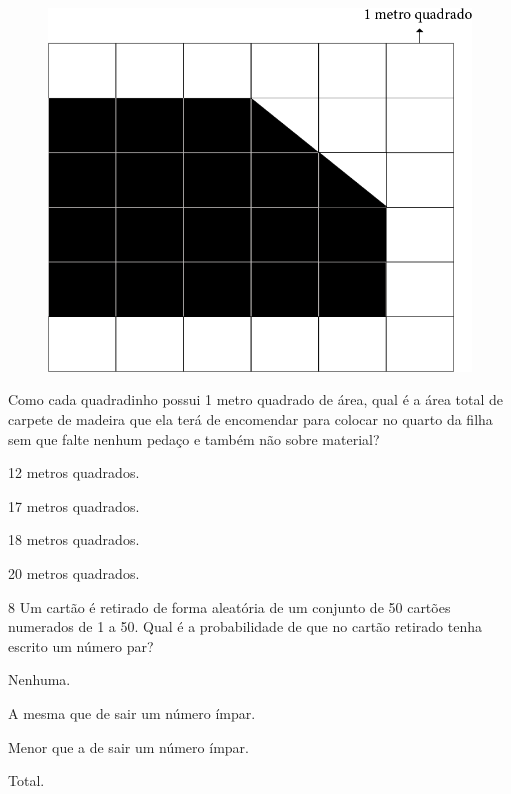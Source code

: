 \begin{figure}[htpb!]
\centering
\includegraphics[width=\textwidth]{media/image84.png}
\end{figure}

Como cada quadradinho possui 1 metro quadrado de área, qual é a área total
de carpete de madeira que ela terá de encomendar para colocar no quarto
da filha sem que falte nenhum pedaço e também não sobre material?

\begin{escolha}
\item
  12 metros quadrados.
\item
  17 metros quadrados.
\item
  18 metros quadrados.
\item
  20 metros quadrados.
\end{escolha}


\num{8} Um cartão é retirado de forma aleatória de um conjunto de 50 cartões
numerados de 1 a 50. Qual é a probabilidade de que no cartão retirado
tenha escrito um número par?

\begin{escolha}
\item
  Nenhuma.
\item
  A mesma que de sair um número ímpar.
\item
  Menor que a de sair um número ímpar.
\item
  Total.
\end{escolha}



